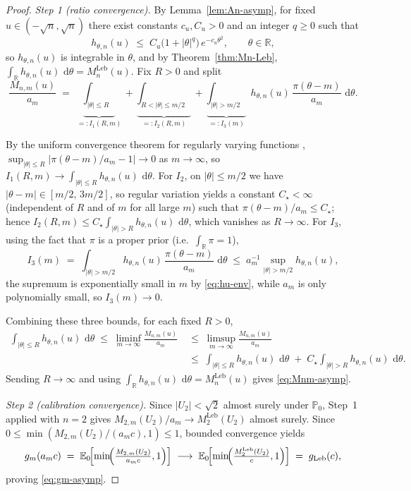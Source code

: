 \documentclass[numsec,webpdf,modern,medium,namedate]{oup-authoring-template}
\theoremstyle{thmstyleone}%
\theoremstyle{thmstyletwo}%
\theoremstyle{thmstylethree}%
\newcommand{\E}{\mathbb{E}}
\newcommand{\Prob}{\mathbb{P}}
\newcommand{\dd}{\,\mathrm{d}}
\newcommand{\Leb}{\mathrm{Leb}}
\newcommand{\1}{\mathbf{1}}
\begin{document}
\begin{proof}
\emph{Step 1 (ratio convergence).} By Lemma~\ref{lem:An-asymp}, for fixed
$u\in(-\sqrt n,\sqrt n)$ there exist constants $c_u, C_u > 0$ and an integer
$q\geq 0$ such that
\begin{equation}\label{eq:hu-env}
  h_{\theta,n}(u)\;\leq\; C_u\bigl(1+|\theta|^q\bigr)\,e^{-c_u\theta^2},
  \qquad \theta\in\mathbb{R},
\end{equation}
so $h_{\theta,n}(u)$ is integrable in $\theta$, and by Theorem~\ref{thm:Mn-Leb},
$\int_\mathbb{R} h_{\theta,n}(u)\,\dd\theta = M_n^{\Leb}(u)$. Fix $R>0$ and split
\[
  \frac{M_{n,m}(u)}{a_m}
  \;=\;\underbrace{\int_{|\theta|\leq R}}_{=:I_1(R,m)}
   +\underbrace{\int_{R<|\theta|\leq m/2}}_{=:I_2(R,m)}
   +\underbrace{\int_{|\theta|>m/2}}_{=:I_3(m)}\;
   h_{\theta,n}(u)\,\frac{\pi(\theta-m)}{a_m}\,\dd\theta.
\]

By the uniform convergence theorem for regularly varying functions
\citep[Theorem~1.2.1]{Bingham1987}, $\sup_{|\theta|\leq R}|\pi(\theta-m)/a_m-1|\to 0$
as $m\to\infty$, so $I_1(R,m)\to\int_{|\theta|\leq R}h_{\theta,n}(u)\,\dd\theta$.
For $I_2$, on $|\theta|\leq m/2$ we have $|\theta-m|\in[m/2,\,3m/2]$, so
regular variation yields a constant $C_\star<\infty$ (independent of $R$ and of
$m$ for all large $m$) such that $\pi(\theta-m)/a_m\leq C_\star$; hence
$I_2(R,m)\leq C_\star\int_{|\theta|>R}h_{\theta,n}(u)\,\dd\theta$, which vanishes
as $R\to\infty$. For $I_3$, using the fact that $\pi$ is a proper prior
(i.e.\ $\int_\mathbb{R}\pi=1$),
\[
I_3(m)\;=\;\int_{|\theta|>m/2}h_{\theta,n}(u)\,\frac{\pi(\theta-m)}{a_m}\,\dd\theta
   \;\leq\; a_m^{-1}\sup_{|\theta|>m/2}h_{\theta,n}(u),
\]
the supremum is exponentially small in $m$ by \eqref{eq:hu-env}, while $a_m$ is
only polynomially small, so $I_3(m)\to 0$.

Combining these three bounds, for each fixed $R>0$,
\begin{align*}
   \int_{|\theta|\leq R}h_{\theta,n}(u)\,\dd\theta
   \;\leq\; \liminf_{m\to\infty}\frac{M_{n,m}(u)}{a_m}
   &\;\leq\; \limsup_{m\to\infty}\frac{M_{n,m}(u)}{a_m}\\
   & \;\leq\; \int_{|\theta|\leq R}h_{\theta,n}(u)\,\dd\theta
   \;+\; C_\star\!\int_{|\theta|>R}h_{\theta,n}(u)\,\dd\theta.
\end{align*}
Sending $R\to\infty$ and using $\int_\mathbb{R} h_{\theta,n}(u)\,\dd\theta
= M_n^{\Leb}(u)$ gives \eqref{eq:Mnm-asymp}.

\emph{Step 2 (calibration convergence).}
Since \(|U_2|<\sqrt 2\) almost surely under \(\Prob_0\), Step~1 applied with \(n=2\) gives
\(M_{2,m}(U_2)/a_m\to M_2^{\Leb}(U_2)\) almost surely. Since \(0\leq\min(M_{2,m}(U_2)/(a_m c),1)\leq 1\), bounded convergence yields
\[
  g_m(a_m c)
  \;=\;\E_0\!\Bigl[\min\!\Bigl(\tfrac{M_{2,m}(U_2)}{a_mc},1\Bigr)\Bigr]
  \;\longrightarrow\;
  \E_0\!\Bigl[\min\!\Bigl(\tfrac{M_2^{\Leb}(U_2)}{c},1\Bigr)\Bigr]
  \;=\;g_{\Leb}(c),
\]
proving \eqref{eq:gm-asymp}.


\end{proof}
\end{document}
